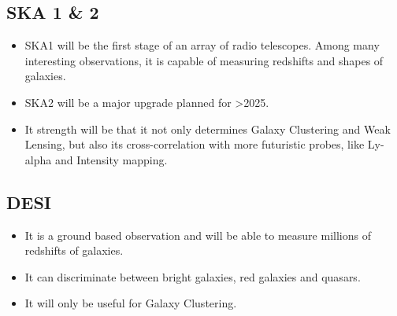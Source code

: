 \subsection{SKA 1 \& 2}
\begin{itemize}
\item SKA1 will be the first stage of an array of radio telescopes. Among
many interesting observations, it is capable of measuring redshifts
and shapes of galaxies.
\item SKA2 will be a major upgrade planned for \textgreater{}2025. 
\item It strength will be that it not only determines Galaxy Clustering
and Weak Lensing, but also its cross-correlation with more futuristic
probes, like Ly-alpha and Intensity mapping.
\end{itemize}

\subsection{DESI}
\begin{itemize}
\item It is a ground based observation and will be able to measure millions
of redshifts of galaxies. 
\item It can discriminate between bright galaxies, red galaxies and quasars.
\item It will only be useful for Galaxy Clustering.
\end{itemize}